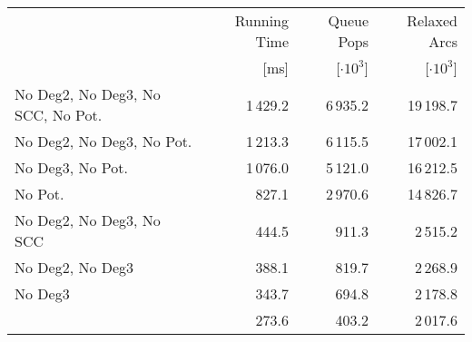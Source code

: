 \begin{tabular}{lrrr}
\toprule
{} & Running Time &     Queue Pops &   Relaxed Arcs \\
{} &         [ms] & [$\cdot 10^3$] & [$\cdot 10^3$] \\
\midrule
No Deg2, No Deg3, No SCC, No Pot. &           1\,429.2 &          6\,935.2 &           19\,198.7 \\
No Deg2, No Deg3, No Pot.         &           1\,213.3 &          6\,115.5 &           17\,002.1 \\
No Deg3, No Pot.                  &           1\,076.0 &          5\,121.0 &           16\,212.5 \\
No Pot.                           &            827.1 &          2\,970.6 &           14\,826.7 \\
No Deg2, No Deg3, No SCC          &            444.5 &           911.3 &            2\,515.2 \\
No Deg2, No Deg3                  &            388.1 &           819.7 &            2\,268.9 \\
No Deg3                           &            343.7 &           694.8 &            2\,178.8 \\
                                  &            273.6 &           403.2 &            2\,017.6 \\
\bottomrule
\end{tabular}

